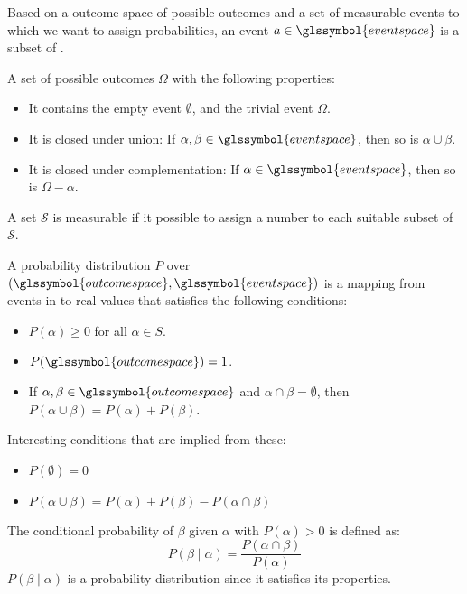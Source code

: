 
{%
  Based on a \gls{outcome space} of possible outcomes  and a set of measurable events  to which we want to assign probabilities, an event $a \in \glssymbol{event space}$ is a subset of .\\
}

{%
  A set of possible outcomes $\Omega$ with the following properties:
  \begin{itemize}
    \item It contains the empty event $\emptyset$, and the trivial event $\Omega$.
    \item It is closed under union: If $\alpha, \beta \in \glssymbol{event space}$, then so is $\alpha \cup \beta$.
    \item It is closed under complementation: If $\alpha \in \glssymbol{event space}$, then so is $\Omega - \alpha$.
  \end{itemize}
}

{%
  A set $\mathcal{S}$ is measurable if it possible to assign a number to each suitable subset of $\mathcal{S}$.
}

{%
  A probability distribution $P$ over $(\glssymbol{outcome space},\glssymbol{event space})$ is a mapping from events in  to real values that satisfies the following conditions:
  \begin{itemize}
    \item $P(\alpha)\geq 0 $ for all $ \alpha \in S$.
    \item $P(\glssymbol{outcome space})=1$.
    \item If $\alpha,\beta\in \glssymbol{outcome space}$ and $\alpha\cap\beta = \emptyset$, then $P(\alpha\cup\beta)=P(\alpha)+P(\beta)$.
  \end{itemize}
  Interesting conditions that are implied from these:
  \begin{itemize}
    \item $P(\emptyset)=0$
    \item $P(\alpha\cup\beta)=P(\alpha)+P(\beta)-P(\alpha\cap\beta)$
  \end{itemize}
}

{%
  The conditional probability of $\beta$ given $\alpha$ with $P(\alpha)>0$ is defined as:
  \begin{equation*}
    P(\beta\mid\alpha)=\frac{P(\alpha\cap\beta)}{P(\alpha)}
  \end{equation*}
  $P(\beta\mid\alpha)$ is a \gls{probability distribution} since it satisfies its properties.
}

